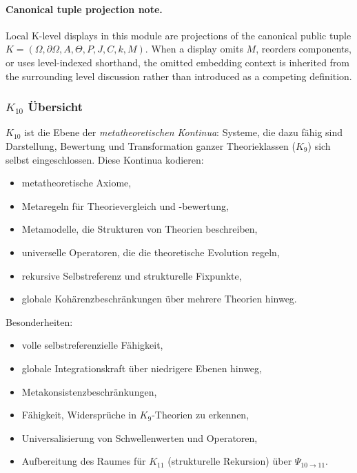 



\paragraph{Canonical tuple projection note.}
Local K-level displays in this module are projections of the canonical public tuple \(K=(\Omega,\partial\Omega,A,\Theta,P,J,C,k,M)\). When a display omits \(M\), reorders components, or uses level-indexed shorthand, the omitted embedding context is inherited from the surrounding level discussion rather than introduced as a competing definition.

\subsubsection{$K_{10}$ Übersicht}
\label{sec:k10-overview}

$K_{10}$ ist die Ebene der \emph{metatheoretischen Kontinua}: Systeme, die dazu fähig sind
Darstellung, Bewertung und Transformation ganzer Theorieklassen ($K_9$)
sich selbst eingeschlossen. Diese Kontinua kodieren:
\begin{itemize}
    \item metatheoretische Axiome,
    \item Metaregeln für Theorievergleich und -bewertung,
    \item Metamodelle, die Strukturen von Theorien beschreiben,
    \item universelle Operatoren, die die theoretische Evolution regeln,
    \item rekursive Selbstreferenz und strukturelle Fixpunkte,
    \item globale Kohärenzbeschränkungen über mehrere Theorien hinweg.
\end{itemize}

Besonderheiten:
\begin{itemize}
    \item volle selbstreferenzielle Fähigkeit,
    \item globale Integrationskraft über niedrigere Ebenen hinweg,
    \item Metakonsistenzbeschränkungen,
    \item Fähigkeit, Widersprüche in $K_9$-Theorien zu erkennen,
    \item Universalisierung von Schwellenwerten und Operatoren,
    \item Aufbereitung des Raumes für $K_{11}$ (strukturelle Rekursion) über $\Psi_{10\to11}$.
\end{itemize}

